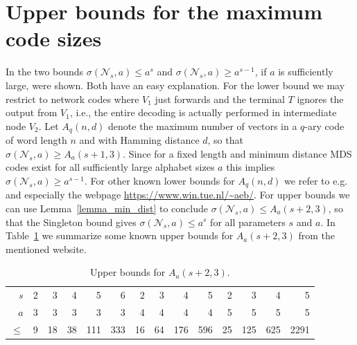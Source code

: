\documentclass[11pt]{article}
\newcommand{\cN}{\mathcal{N}}
\begin{document}
\section{Upper bounds for the maximum code sizes}
\label{sec_bounds}
In \cite{beemer2022network_arxiv} the two bounds $\sigma(\cN_s,a)\le a^s$ and $\sigma(\cN_s,a)\ge a^{s-1}$, if $a$ is sufficiently large, were shown. Both have an easy explanation. 
For the lower bound we may restrict to network codes where $V_1$ just forwards and the terminal $T$ ignores the output from $V_1$, i.e., the entire decoding is actually performed 
in intermediate node $V_2$. Let $A_q(n,d)$ denote the maximum number of vectors in a $q$-ary code of word length $n$ and with Hamming distance $d$, so that 
$\sigma(\cN_s,a)\ge A_a(s+1,3)$. Since for a fixed length and minimum distance MDS codes exist for all sufficiently large alphabet sizes $a$ this implies $\sigma(\cN_s,a)\ge a^{s-1}$. 
For other known lower bounds for $A_q(n,d)$ we refer to e.g.\ \cite{bogdanova2001error,bogdanova2001bounds,brouwer1998bounds} %
and especially the webpage 
\url{https://www.win.tue.nl/~aeb/}. For upper bounds we can use Lemma~\ref{lemma_min_dist} to conclude $\sigma(\cN_s,a)\le A_a(s+2,3)$, so that the Singleton bound gives 
$\sigma(\cN_s,a)\le a^s$ for all parameters $s$ and $a$. In Table~\ref{table_ub_codes} we summarize some known upper bounds for $A_a(s+2,3)$ from the mentioned website.          

\begin{table}[htp]
  \begin{center}
    \begin{tabular}{rrrrrrrrrrrrrr}
      \hline
      $s$     & 2 &  3 &  4 &   5 &   6 &  2 &  3 &   4 &   5 &  2 &   3 &   4 &    5 \\ 
      $a$     & 3 &  3 &  3 &   3 &   3 &  4 &  4 &   4 &   4 &  5 &   5 &   5 &    5 \\ 
      $\le$ & 9 & 18 & 38 & 111 & 333 & 16 & 64 & 176 & 596 & 25 & 125 & 625 & 2291 \\      
      \hline
    \end{tabular}
    \caption{Upper bounds for $A_a(s+2,3)$.}
    \label{table_ub_codes}
  \end{center}   
\end{table}
\end{document}
